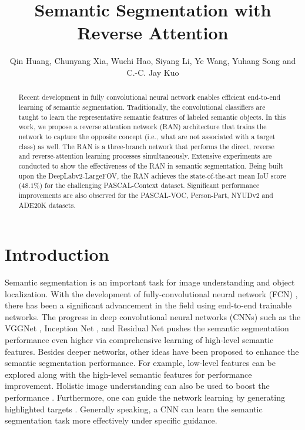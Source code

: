 \documentclass[runningheads]{llncs}
\begin{document}
\pagestyle{headings}
\mainmatter



\title{Semantic Segmentation with Reverse Attention} 

\author{Qin Huang, Chunyang Xia, Wuchi Hao, Siyang Li, Ye Wang, Yuhang Song and C.-C. Jay Kuo}

\maketitle





\begin{abstract}
Recent development in fully convolutional neural network enables efficient end-to-end learning of
semantic segmentation. Traditionally,  the convolutional classifiers are taught to learn the representative semantic features
of labeled semantic objects.  In this work, we
propose a reverse attention network (RAN) architecture that trains the
network to capture the opposite concept (i.e., what are not associated
with a target class) as well. The RAN is a three-branch network that
performs the direct, reverse and reverse-attention learning processes
simultaneously.  Extensive experiments are conducted to show the
effectiveness of the RAN in semantic segmentation.  Being built upon the
DeepLabv2-LargeFOV, the RAN achieves the state-of-the-art mean IoU score
($48.1\%$) for the challenging PASCAL-Context dataset.  Significant
performance improvements are also observed for the PASCAL-VOC, Person-Part, NYUDv2 and ADE20K datasets. 
\end{abstract}

\section{Introduction}\label{sec:intro}

Semantic segmentation is an important task for image understanding and
object localization.  With the development of fully-convolutional neural
network (FCN) \cite{long2015fully}, there has been a significant
advancement in the field using end-to-end trainable networks.  The
progress in deep convolutional neural networks (CNNs) such as the VGGNet
\cite{simonyan2014very}, Inception Net \cite{szegedy2015going}, and
Residual Net \cite{he2015deep} pushes the semantic segmentation
performance even higher via comprehensive learning of high-level
semantic features.  Besides deeper networks, other ideas have been
proposed to enhance the semantic segmentation performance. For example,
low-level features can be explored along with the high-level semantic
features \cite{bishop2006pattern} for performance
improvement.  Holistic image understanding can also be used to boost the
performance \cite{lin2016refinenet,zhao2016pyramid,hu2016recalling}.
Furthermore, one can guide the network learning by generating
highlighted targets \cite{doersch2015unsupervised, dai2016instance, dai2016r,shrivastava2016training,wu2016high,wu2016bridging}. Generally
speaking, a CNN can learn the semantic segmentation task more
effectively under specific guidance. 
\end{document}

